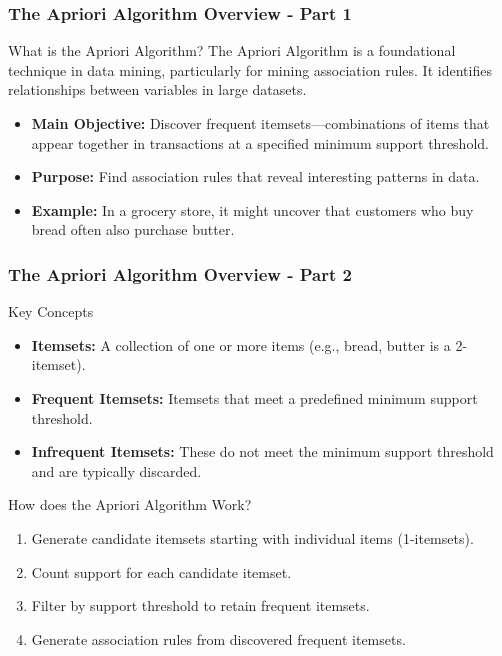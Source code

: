 \documentclass[aspectratio=169]{beamer}
\begin{document}
\begin{frame}[fragile]
    \frametitle{The Apriori Algorithm Overview - Part 1}
    \begin{block}{What is the Apriori Algorithm?}
        The Apriori Algorithm is a foundational technique in data mining, particularly for mining association rules. It identifies relationships between variables in large datasets. 
        \begin{itemize}
            \item \textbf{Main Objective:} Discover frequent itemsets—combinations of items that appear together in transactions at a specified minimum support threshold.
            \item \textbf{Purpose:} Find association rules that reveal interesting patterns in data.
            \item \textbf{Example:} In a grocery store, it might uncover that customers who buy bread often also purchase butter.
        \end{itemize}
    \end{block}
\end{frame}

\begin{frame}[fragile]
    \frametitle{The Apriori Algorithm Overview - Part 2}
    \begin{block}{Key Concepts}
        \begin{itemize}
            \item \textbf{Itemsets:} A collection of one or more items (e.g., {bread, butter} is a 2-itemset).
            \item \textbf{Frequent Itemsets:} Itemsets that meet a predefined minimum support threshold.
            \item \textbf{Infrequent Itemsets:} These do not meet the minimum support threshold and are typically discarded.
        \end{itemize}
    \end{block}

    \begin{block}{How does the Apriori Algorithm Work?}
        \begin{enumerate}
            \item Generate candidate itemsets starting with individual items (1-itemsets).
            \item Count support for each candidate itemset.
            \item Filter by support threshold to retain frequent itemsets.
            \item Generate association rules from discovered frequent itemsets.
        \end{enumerate}
    \end{block}
\end{frame}
\end{document}

